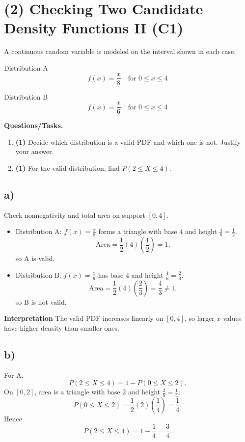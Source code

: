 \section{(2) Checking Two Candidate Density Functions II (C1)}

A continuous random variable is modeled on the interval shown in each case.

Distribution A
\[
f(x)=\frac{x}{8}\quad\text{for }0\le x\le 4
\]

Distribution B
\[
f(x)=\frac{x}{6}\quad\text{for }0\le x\le 4
\]

\textbf{Questions/Tasks.}
\begin{enumerate}[label=\textbf{\alph*)}]
	\item \textbf{(1)} Decide which distribution is a valid PDF and which one is not. Justify your answer.
	\item \textbf{(1)} For the valid distribution, find $P(2\le X\le 4)$.
\end{enumerate}

\subsection*{a)}

Check nonnegativity and total area on support $[0,4]$.
\begin{itemize}
	\item Distribution A: $f(x)=\frac{x}{8}$ forms a triangle with base $4$ and height $\frac{4}{8}=\frac12$.
	\[
	\text{Area}=\frac12(4)\left(\frac12\right)=1,
	\]
	so A is valid.
	\item Distribution B: $f(x)=\frac{x}{6}$ has base $4$ and height $\frac{4}{6}=\frac23$.
	\[
	\text{Area}=\frac12(4)\left(\frac23\right)=\frac43\ne1,
	\]
	so B is not valid.
\end{itemize}

\textbf{Interpretation}
The valid PDF increases linearly on $[0,4]$, so larger $x$ values have higher density than smaller ones.

\subsection*{b)}
For A,
\[
P(2\le X\le4)=1-P(0\le X\le2).
\]
On $[0,2]$, area is a triangle with base $2$ and height $\frac{2}{8}=\frac14$:
\[
P(0\le X\le2)=\frac12(2)\left(\frac14\right)=\frac14.
\]
Hence
\[
P(2\le X\le4)=1-\frac14=\frac34.
\]

